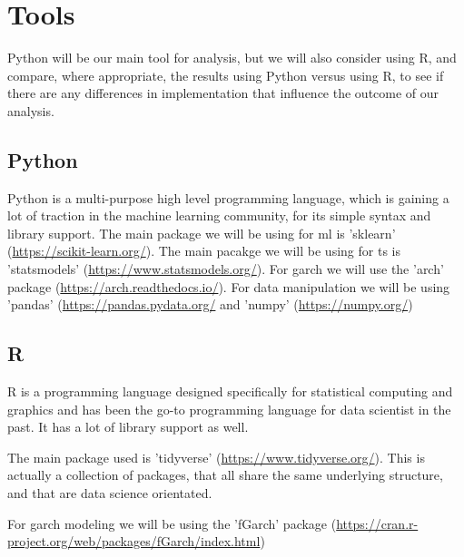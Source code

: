 \chapter{Tools}
Python will be our main tool for analysis, but we will also consider using R, and compare, where appropriate, the results using Python versus using R, to see if there are any differences in implementation that influence the outcome of our analysis.

\section{Python}
Python is a multi-purpose high level programming language, which is gaining a lot of traction in the machine learning community, for its simple syntax and library support.
The main package we will be using for \acrlong{ml} is 'sklearn' (\url{https://scikit-learn.org/}).
The main pacakge we will be using for \acrlong{ts} is 'statsmodels' (\url{https://www.statsmodels.org/}).
For \acrshort{garch} we will use the 'arch' package (\url{https://arch.readthedocs.io/}).
For data manipulation we will be using 'pandas' (\url{https://pandas.pydata.org/} and 'numpy' (\url{https://numpy.org/})

\section{R}
R is a programming language designed specifically for statistical computing and graphics and has been the go-to programming language for data scientist in the past. It has a lot of library support as well.


The main package used is 'tidyverse' (\url{https://www.tidyverse.org/}). This is actually a collection of packages, that all share the same underlying structure, and that are data science orientated.


For \acrshort{garch} modeling we will be using the 'fGarch' package (\url{https://cran.r-project.org/web/packages/fGarch/index.html})